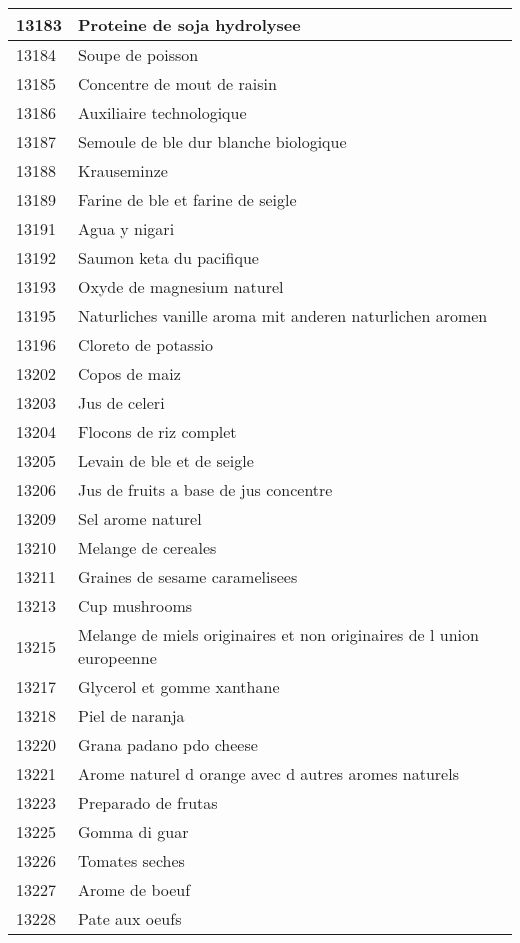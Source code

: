 \begin{longtable}{|l|l|}
13183 & Proteine de soja hydrolysee \\ \hline 
13184 & Soupe de poisson \\ \hline 
13185 & Concentre de mout de raisin \\ \hline 
13186 & Auxiliaire technologique \\ \hline 
13187 & Semoule de ble dur blanche biologique \\ \hline 
13188 & Krauseminze \\ \hline 
13189 & Farine de ble et farine de seigle \\ \hline 
13191 & Agua y nigari \\ \hline 
13192 & Saumon keta du pacifique \\ \hline 
13193 & Oxyde de magnesium naturel \\ \hline 
13195 & Naturliches vanille aroma mit anderen naturlichen aromen \\ \hline 
13196 & Cloreto de potassio \\ \hline 
13202 & Copos de maiz \\ \hline 
13203 & Jus de celeri \\ \hline 
13204 & Flocons de riz complet \\ \hline 
13205 & Levain de ble et de seigle \\ \hline 
13206 & Jus de fruits a base de jus concentre \\ \hline 
13209 & Sel arome naturel \\ \hline 
13210 & Melange de cereales \\ \hline 
13211 & Graines de sesame caramelisees \\ \hline 
13213 & Cup mushrooms \\ \hline 
13215 & Melange de miels originaires et non originaires de l union europeenne \\ \hline 
13217 & Glycerol et gomme xanthane \\ \hline 
13218 & Piel de naranja \\ \hline 
13220 & Grana padano pdo cheese \\ \hline 
13221 & Arome naturel d orange avec d autres aromes naturels \\ \hline 
13223 & Preparado de frutas \\ \hline 
13225 & Gomma di guar \\ \hline 
13226 & Tomates seches \\ \hline 
13227 & Arome de boeuf \\ \hline 
13228 & Pate aux oeufs \\ \hline 

\end{longtable}
